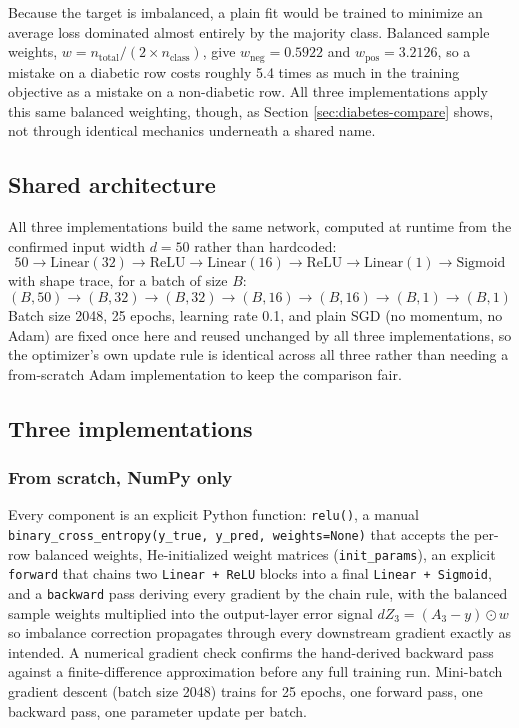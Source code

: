 \documentclass[11pt]{article}
\newcommand{\code}[1]{\texttt{#1}}
\begin{document}
Because the target is imbalanced, a plain fit would be trained to minimize an
average loss dominated almost entirely by the majority class. Balanced sample
weights, $w = n_{\text{total}} / (2 \times n_{\text{class}})$, give
$w_{\text{neg}} = 0.5922$ and $w_{\text{pos}} = 3.2126$, so a mistake on a
diabetic row costs roughly 5.4 times as much in the training objective as a
mistake on a non-diabetic row. All three implementations apply this same
balanced weighting, though, as Section \ref{sec:diabetes-compare} shows, not
through identical mechanics underneath a shared name.

\subsection{Shared architecture}

All three implementations build the same network, computed at runtime from
the confirmed input width $d = 50$ rather than hardcoded:
\[
50 \to \text{Linear}(32) \to \text{ReLU} \to \text{Linear}(16) \to \text{ReLU}
\to \text{Linear}(1) \to \text{Sigmoid}
\]
with shape trace, for a batch of size $B$:
\[
(B, 50) \to (B, 32) \to (B, 32) \to (B, 16) \to (B, 16) \to (B, 1) \to (B, 1)
\]
Batch size 2048, 25 epochs, learning rate 0.1, and plain SGD (no momentum, no
Adam) are fixed once here and reused unchanged by all three implementations,
so the optimizer's own update rule is identical across all three rather than
needing a from-scratch Adam implementation to keep the comparison fair.

\subsection{Three implementations}

\subsubsection{From scratch, NumPy only}

Every component is an explicit Python function: \code{relu()}, a manual
\code{binary\_cross\_entropy(y\_true, y\_pred, weights=None)} that accepts the
per-row balanced weights, He-initialized weight matrices
(\code{init\_params}), an explicit \code{forward} that chains two
\code{Linear + ReLU} blocks into a final \code{Linear + Sigmoid}, and a
\code{backward} pass deriving every gradient by the chain rule, with the
balanced sample weights multiplied into the output-layer error signal
$dZ_3 = (A_3 - y) \odot w$ so imbalance correction propagates through every
downstream gradient exactly as intended. A numerical gradient check confirms
the hand-derived backward pass against a finite-difference approximation
before any full training run. Mini-batch gradient descent (batch size 2048)
trains for 25 epochs, one forward pass, one backward pass, one parameter
update per batch.
\end{document}
